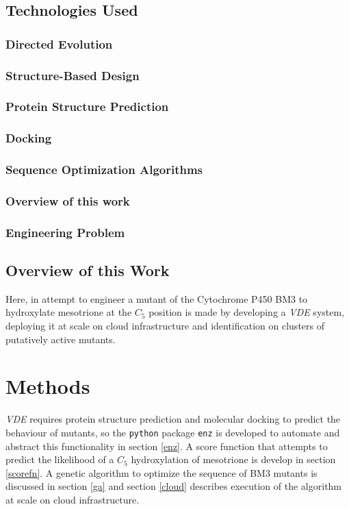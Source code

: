 \documentclass[16pt]{article}
\begin{document}
\subsection{Technologies Used}
\subsubsection{Directed Evolution}
\subsubsection{Structure-Based Design}
\subsubsection{Protein Structure Prediction}
\subsubsection{Docking}
\subsubsection{Sequence Optimization Algorithms}
\subsubsection{Overview of this work}
\subsubsection{Engineering Problem}
\subsection{Overview of this Work}

Here, in attempt to engineer a mutant of the Cytochrome P450 BM3 to hydroxylate mesotrione at the $C_5$ position is made by developing a \textit{VDE} system, deploying it at scale on cloud infrastructure and identification on clusters of putatively active mutants.
\section{Methods}

\textit{VDE} requires protein structure prediction and molecular docking to predict the behaviour of mutants, so the \texttt{python} package \texttt{enz} is developed to automate and abstract this functionality in section \ref{enz}.
A score function that attempts to predict the likelihood of a $C_5$ hydroxylation of mesotrione is develop in section \ref{scorefn}.
A genetic algorithm to optimize the sequence of BM3 mutants is discussed in section \ref{ga} and section \ref{cloud} describes execution of the algorithm at scale on cloud infrastructure.
\end{document}
